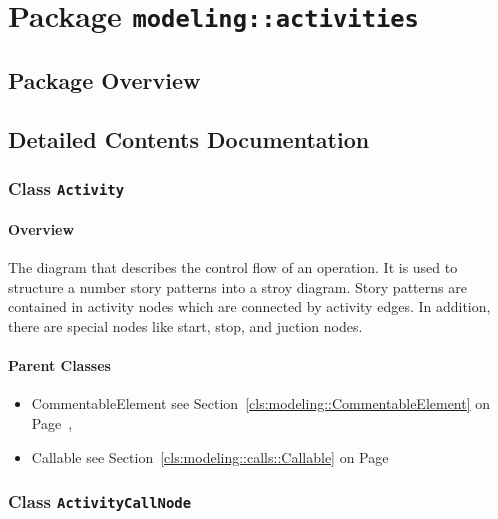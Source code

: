 \section{Package \bfseries \texttt{modeling::activities}\normalfont}
\subsection{Package Overview}
	
			
		



\subsection{Detailed Contents Documentation}
\subsubsection{\Large{Class \bfseries \texttt{Activity}\normalfont}}
\label{cls:modeling::activities::Activity} 
\paragraph{Overview}

	
			
The diagram that describes the control flow of an operation. It is used to structure a number story patterns into a stroy diagram. Story patterns are contained in activity nodes which are connected by activity edges. In addition, there are special nodes like start, stop, and juction nodes.  	
		
	



\paragraph{Parent Classes}
\begin{itemize}
\item CommentableElement see Section~\ref{cls:modeling::CommentableElement} on Page~\pageref{cls:modeling::CommentableElement}, \item Callable see Section~\ref{cls:modeling::calls::Callable} on Page~\pageref{cls:modeling::calls::Callable}\end{itemize}
\subsubsection{\Large{Class \bfseries \texttt{ActivityCallNode}\normalfont}}
\label{cls:modeling::activities::ActivityCallNode} 
